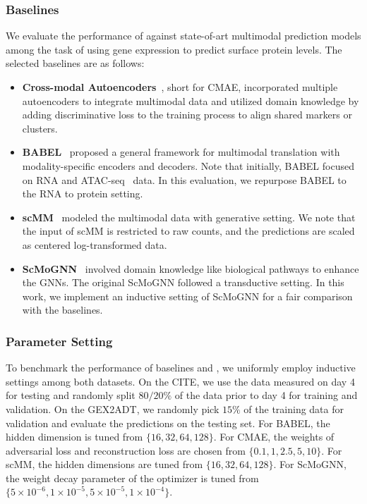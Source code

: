 \subsubsection{Baselines}
We evaluate the performance of \method{} against state-of-art multimodal prediction models among the task of using gene expression to predict surface protein levels. The selected baselines are as follows:
\begin{itemize}[leftmargin=*]
    \item \textbf{Cross-modal Autoencoders}~\cite{yang2021multi}, short for CMAE, incorporated multiple autoencoders to integrate multimodal data and utilized domain knowledge by adding discriminative loss to the training process to align shared markers or clusters.
    \item \textbf{BABEL}~\cite{wu2021babel} proposed a general framework for multimodal translation with modality-specific encoders and decoders. Note that initially, BABEL focused on RNA and ATAC-seq~\cite{buenrostro2013transposition} data. In this evaluation, we repurpose BABEL to the RNA to protein setting.
    \item \textbf{scMM}~\cite{minoura2021mixture} modeled the multimodal data with generative setting. We note that the input of scMM is restricted to raw counts, and the predictions are scaled as centered log-transformed data.
    \item \textbf{ScMoGNN}~\cite{wen2022graph} involved domain knowledge like biological pathways to enhance the GNNs. The original ScMoGNN followed a transductive setting. In this work, we implement an inductive setting of ScMoGNN for a fair comparison with the baselines.
\end{itemize}

\subsubsection{Parameter Setting}
To benchmark the performance of baselines and \method{}, we uniformly employ inductive settings among both datasets. On the CITE, we use the data measured on day 4 for testing and randomly split $80/20\%$ of the data prior to day 4 for training and validation. On the GEX2ADT, we randomly pick $15\%$ of the training data for validation and evaluate the predictions on the testing set. For BABEL, the hidden dimension is tuned from $\{16, 32, 64, 128\}$. For CMAE, the weights of adversarial loss and reconstruction loss are chosen from $\{0.1, 1, 2.5, 5, 10\}$. For scMM, the hidden dimensions are tuned from $\{16, 32, 64, 128\}$. For ScMoGNN, the weight decay parameter of the optimizer is tuned from $\{5\times 10^{-6},1 \times 10^{-5}, 5 \times 10^{-5}, 1 \times 10^{-4}\}$.

